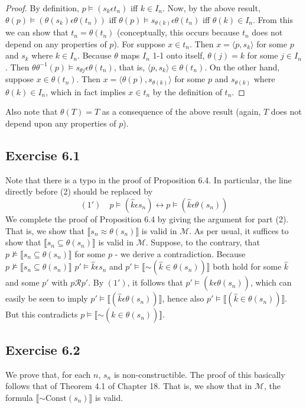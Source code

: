 \documentclass{article}
\newcommand*{\oldneg}{\mathord{\sim}}
\newcommand{\lbc}{\llbracket}
\newcommand{\rbc}{\rrbracket}
\let\biconditional\leftrightarrow
\theoremstyle{definition}
\begin{document}
\begin{proof}
By definition, 
$p\vDash (s_k\epsilon t_n)$ iff $k\in I_n$. Now, by the above result,
$\theta(p)\vDash (\theta(s_k)\epsilon\theta(t_n))$ iff 
$\theta(p)\vDash s_{\theta(k)}\epsilon\theta(t_n)$ iff $\theta(k)\in I_n$. From this we can show that 
$t_n=\theta(t_n)$ (conceptually, this occurs because $t_n$ does not depend on any properties of $p$). For suppose 
$x\in t_n$. Then $x=\langle p,s_k\rangle$ for some $p$ and $s_k$ where $k\in I_n$.
Because $\theta$ maps $I_n$ 1-1 onto itself, $\theta(j)=k$ for some $j\in I_n$.
Then $\theta\theta^{-1}(p)\vDash s_{\theta{j}}\epsilon\theta(t_n)$,
that is, $\langle p,s_k\rangle\in\theta(t_n)$. On the other hand, suppose 
$x\in\theta(t_n)$. Then $x=\langle\theta(p),s_{\theta(k)}\rangle$ for some $p$ and $s_{\theta(k)}$ where 
$\theta(k)\in I_n$, which in fact implies $x\in t_n$ by the definition of $t_n$.

\end{proof} 

Also note that $\theta(T)=T$ as a consequence of the above result (again, $T$ does not depend upon any properties of $p$).

\subsection*{Exercise 6.1}
Note that there is a typo in the proof of Proposition 6.4. In particular, the line directly before (2) should be replaced by
\[ (1')\quad p\vDash(\hat{k}\epsilon s_n)\biconditional p\vDash(\hat{k}\epsilon\theta(s_n)) \]
We complete the proof of Proposition 6.4 by giving the argument for part (2). That is, we show that 
$\lbc s_n\approx\theta(s_n)\rbc$ is valid in $\mathcal{M}$. As per usual, it suffices to show that 
$\lbc s_n\subseteq\theta(s_n)\rbc$ is valid in $\mathcal{M}$. Suppose, to the contrary, that 
$p\nvDash\lbc s_n\subseteq\theta(s_n)\rbc$ for some $p$ - we derive a contradiction. Because 
$p\nvDash\lbc s_n\subseteq\theta(s_n)\rbc$ 
$p'\vDash \hat{k}\epsilon s_n$ and $p'\vDash\lbc\oldneg(\hat{k}\in\theta(s_n))\rbc$ both hold for some 
$\hat{k}$ and some $p'$ with $p\mathcal{R}p'$. By $(1')$, it follows that 
$p'\vDash(\hat{k}\epsilon\theta(s_n))$, which can easily be seen to imply 
$p'\vDash\lbc(\hat{k}\epsilon\theta(s_n))\rbc$, hence also 
$p'\vDash\lbc(\hat{k}\in\theta(s_n))\rbc$. But this contradicts 
$p\vDash\lbc\oldneg(\hat{k}\in\theta(s_n))\rbc$.

\subsection*{Exercise 6.2}
We prove that, for each $n$, $s_n$ is non-constructible. The proof of this basically follows that of Theorem 4.1 of 
Chapter 18. That is, we show that in $\mathcal{M}$, the formula $\lbc\oldneg\textrm{Const}(s_n)\rbc$ is valid. 
\end{document}
